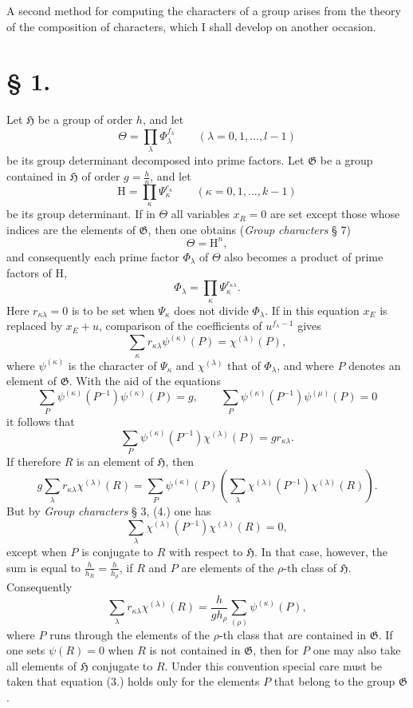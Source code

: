 \documentclass[11pt]{article}
\newcommand{\Hgr}{\mathfrak{H}}
\newcommand{\Ggr}{\mathfrak{G}}
\begin{document}
A second method for computing the characters of a group arises from the theory of the composition of characters, which I shall develop on another occasion.

\section*{§ 1.}

Let $\Hgr$ be a group of order $h$, and let
\[
  \Theta=\prod_\lambda \Phi_\lambda^{f_\lambda}
  \qquad(\lambda=0,1,\ldots,l-1)
\]
be its group determinant decomposed into prime factors. Let $\Ggr$ be a group contained in $\Hgr$ of order $g=\frac{h}{n}$, and let
\[
  \mathrm H=\prod_\kappa \Psi_\kappa^{e_\kappa}
  \qquad(\kappa=0,1,\ldots,k-1)
\]
be its group determinant. If in $\Theta$ all variables $x_R=0$ are set except those whose indices are the elements of $\Ggr$, then one obtains (\emph{Group characters} § 7)
\[
\tag{1.}
  \Theta=\mathrm H^n,
\]
and consequently each prime factor $\Phi_\lambda$ of $\Theta$ also becomes a product of prime factors of $\mathrm H$,
\[
\tag{2.}
  \Phi_\lambda=\prod_\kappa \Psi_\kappa^{r_{\kappa\lambda}}.
\]
Here $r_{\kappa\lambda}=0$ is to be set when $\Psi_\kappa$ does not divide $\Phi_\lambda$. If in this equation $x_E$ is replaced by $x_E+u$, comparison of the coefficients of $u^{f_\lambda-1}$ gives
\[
\tag{3.}
  \sum_\kappa r_{\kappa\lambda}\psi^{(\kappa)}(P)=\chi^{(\lambda)}(P),
\]
where $\psi^{(\kappa)}$ is the character of $\Psi_\kappa$ and $\chi^{(\lambda)}$ that of $\Phi_\lambda$, and where $P$ denotes an element of $\Ggr$. With the aid of the equations
\[
  \sum_P \psi^{(\kappa)}(P^{-1})\psi^{(\kappa)}(P)=g,
  \qquad
  \sum_P \psi^{(\kappa)}(P^{-1})\psi^{(\mu)}(P)=0
\]
it follows that
\[
\tag{4.}
  \sum_P \psi^{(\kappa)}(P^{-1})\chi^{(\lambda)}(P)=g r_{\kappa\lambda}.
\]
If therefore $R$ is an element of $\Hgr$, then
\[
  g\sum_\lambda r_{\kappa\lambda}\chi^{(\lambda)}(R)
  =
  \sum_P\psi^{(\kappa)}(P)
  \left(\sum_\lambda \chi^{(\lambda)}(P^{-1})\chi^{(\lambda)}(R)\right).
\]
But by \emph{Group characters} § 3, (4.) one has
\[
  \sum_\lambda \chi^{(\lambda)}(P^{-1})\chi^{(\lambda)}(R)=0,
\]
except when $P$ is conjugate to $R$ with respect to $\Hgr$. In that case, however, the sum is equal to $\frac{h}{h_R}=\frac{h}{h_\rho}$, if $R$ and $P$ are elements of the $\rho$-th class of $\Hgr$. Consequently
\[
\tag{5.}
  \sum_\lambda r_{\kappa\lambda}\chi^{(\lambda)}(R)
  =
  \frac{h}{g h_\rho}\sum_{(\rho)}\psi^{(\kappa)}(P),
\]
where $P$ runs through the elements of the $\rho$-th class that are contained in $\Ggr$. If one sets $\psi(R)=0$ when $R$ is not contained in $\Ggr$, then for $P$ one may also take all elements of $\Hgr$ conjugate to $R$. Under this convention special care must be taken that equation (3.) holds only for the elements $P$ that belong to the group $\Ggr$.
\end{document}
